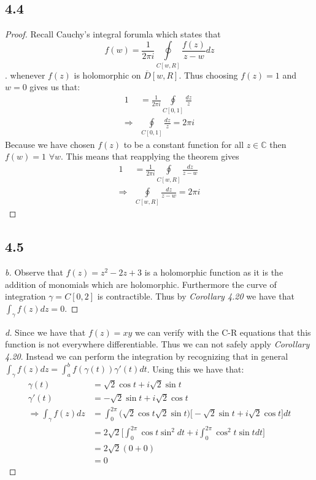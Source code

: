 \documentclass[a4paper, 11pt]{article}
\begin{document}
\subsection*{4.4}
	\begin{proof}
		Recall Cauchy's integral forumla which states that 
			\begin{equation*}
				f(w)=\frac{1}{2\pi i}\oint\limits_{C[w,R]} \frac{f(z)}{z-w}dz
			\end{equation*}. 
		whenever $f(z)$ is holomorphic on $\overline{D}[w,R]$. Thus choosing $f(z)=1$ and $w=0$ gives us that:
			\begin{align*}
				1 &= \frac{1}{2\pi i}\oint\limits_{C[0,1]}\frac{dz}{z} \\ 
				\Rightarrow & \oint\limits_{C[0,1]}\frac{dz}{z} = 2\pi i 
			\end{align*}
		Because we have chosen $f(z)$ to be a constant function for all $z\in\mathbb{C}$ then $f(w)=1$ $\forall w$. This means that reapplying the theorem gives
			\begin{align*}
				1 &= \frac{1}{2\pi i}\oint\limits_{C[w,R]}\frac{dz}{z-w} \\ 
				\Rightarrow & \oint\limits_{C[w,R]}\frac{dz}{z-w} = 2\pi i
			\end{align*}
	\end{proof}

\subsection*{4.5}
	\begin{proof}[b]
		Observe that $f(z) = z^2-2z+3$ is a holomorphic function  as it is the addition of monomials which are holomorphic. Furthermore the curve of integration $\gamma = C[0,2]$ is contractible. Thus by \textit{Corollary 4.20} we have that $\int_{\gamma}f(z)dz = 0$. 
	\end{proof}

	\begin{proof}[d]
		Since we have that $f(z)=xy$ we can verify with the C-R equations that this function is not everywhere differentiable. Thus we can not safely apply \textit{Corollary 4.20}. Instead we can perform the integration by recognizing that in general $\int_\gamma f(z)dz = \int_a^b f(\gamma(t))\gamma'(t)dt$. Using this we have that: 
			\begin{align*}
				\gamma(t) &= \sqrt{2}\cos t + i \sqrt{2} \sin t \\ 
				\gamma'(t) &= -\sqrt{2}\sin t + i \sqrt{2} \cos t \\ 
				\Rightarrow \int_{\gamma}f(z)dz &= \int_0^{2\pi} \Big(\sqrt{2}\cos t \sqrt{2}\sin t\Big)\Big[-\sqrt{2}\sin t + i\sqrt{2} \cos t\Big] dt \\
					&= 2\sqrt{2} \Big[ \int_0^{2\pi}\cos t \sin^2 dt + i\int_0^{2\pi}\cos^2 t \sin t dt \Big] \\ 
					&= 2\sqrt{2}(0+0) \\ 
					&= 0
			\end{align*}
	\end{proof} 
\end{document}
